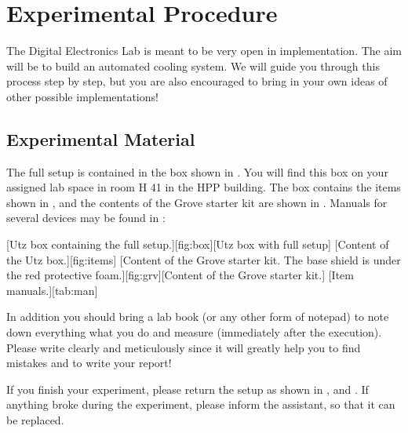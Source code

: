 \section{Experimental Procedure}\label{sec:exp}
The Digital Electronics Lab is meant to be very open in implementation. The aim will be to build an automated cooling system. We will guide you through this process step by step, but you are also encouraged to bring in your own ideas of other possible implementations!
%
\subsection{Experimental Material}\label{sec:material}
The full setup is contained in the box shown in . You will find this box on your assigned lab space in room H 41 in the HPP building. The box contains the items shown in , and the contents of the Grove starter kit are shown in . Manuals for several devices may be found in :\par
%
[Utz box containing the full setup.][fig:box][Utz box with full setup]
%
[Content of the Utz box.][fig:items]
%
[Content of the Grove starter kit. The base shield is under the red protective foam.][fig:grv][Content of the Grove starter kit.]
[Item manuals.][tab:man]
%
\begin{note}
  In addition you should bring a lab book (or any other form of notepad) to note down everything what you do and measure (immediately after the execution). Please write clearly and meticulously since it will greatly help you to find mistakes and to write your report! 
\end{note}
%
\newpage
\begin{note}
  If you finish your experiment, please return the setup as shown in ,  and . If anything broke during the experiment, please inform the assistant, so that it can be replaced.
\end{note}
%
